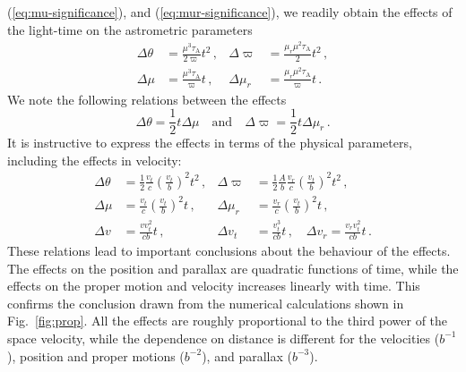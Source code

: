 \documentclass{aa}
\begin{document}
(\ref{eq:mu-significance}), and (\ref{eq:mur-significance}), we readily obtain the effects of the
light-time on the astrometric parameters
\begin{equation}\label{eq:effects}
 \begin{aligned}
    \Delta\theta&=\frac{\mu^3\tau_\mathrm{A}}{2\varpi}t^2 \,,
    &\Delta\varpi&=\frac{\mu_r\mu^2\tau_\mathrm{A}}{2}t^2\,,\\
    \Delta\mu&=\frac{\mu^3\tau_\mathrm{A}}{\varpi}t\,,
    &\Delta\mu_r&=\frac{\mu_r\mu^2\tau_\mathrm{A}}{\varpi}t\,.
 \end{aligned}
\end{equation}
We note the following relations between the effects
\begin{equation}\label{eq:effects-relations}
    \Delta\theta=\frac{1}{2}t\Delta\mu\quad\mbox{and}\quad
    \Delta\varpi=\frac{1}{2}t\Delta\mu_r \, .
\end{equation}
It is instructive to express the effects in
terms of the physical parameters, including the effects in velocity:
\begin{equation}\label{eq:effects_physical}
 \begin{aligned}
    \Delta\theta&=\frac{1}{2}\frac{v_t}{c}\left(\frac{v_t}{b}\right)^2t^2 \,,
    &\Delta\varpi&=\frac{1}{2}\frac{A}{b}\frac{v_r}{c}\left(\frac{v_t}{b}\right)^2t^2\,,\\
    \Delta\mu&=\frac{v_t}{c}\left(\frac{v_t}{b}\right)^2t\,,
    &\Delta\mu_r&=\frac{v_r}{c}\left(\frac{v_t}{b}\right)^2t\,,\\
    \Delta v&=\frac{vv_t^2}{cb}t\,,
    &\Delta v_t&=\frac{v_t^3}{cb}t\,, \quad \Delta v_r=\frac{v_rv_t^2}{cb}t\,.
 \end{aligned}
\end{equation}
These relations lead to important conclusions about the behaviour of the effects. The effects on the
position and parallax are quadratic functions of time, while the effects on the proper motion and velocity
increases linearly with time. This confirms the conclusion drawn from the numerical calculations shown
in Fig.~\ref{fig:prop}. All the effects are roughly proportional to the third power of the space velocity,
while the dependence on distance is different for the velocities ($b^{-1}$),
position and proper motions ($b^{-2}$), and parallax ($b^{-3}$).
\end{document}
